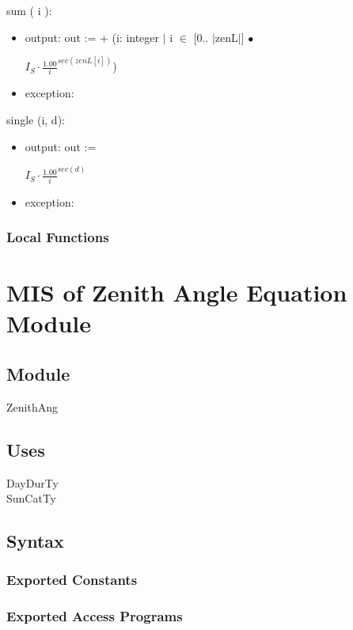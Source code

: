 \documentclass[12pt, titlepage]{article}
\begin{document}
\noindent sum ( i ):
\begin{itemize}
\item output: out := + (i: integer $|$ i $\in$ [0.. $|$zenL$|$] $\bullet$ 
\begin{center}\large
$I_{S} \cdot \frac{1.00}{i}^{sec(zenL [ i ])} $)
\end{center}
\item exception: 
\end{itemize}

\noindent single (i, d):
\begin{itemize}
\item output: out := 
\begin{center}\large
$I_{S} \cdot \frac{1.00}{i}^{sec(d)} $
\end{center}
\item exception: 
\end{itemize}

\subsubsection{Local Functions}


\section{MIS of Zenith Angle Equation Module} \label{ModuleZA} 

\subsection{Module}
ZenithAng


\subsection{Uses}
DayDurTy\\
SunCatTy

\subsection{Syntax}

\subsubsection{Exported Constants}


\subsubsection{Exported Access Programs}
\end{document}
